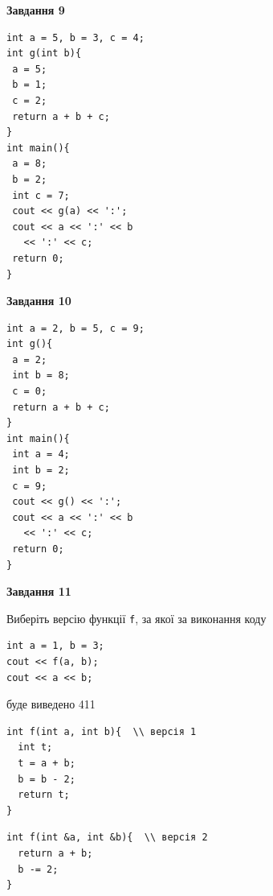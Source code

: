 \documentclass[12pt, ukrainian]{article}
\def\code#1{\Verb!#1!}
\begin{document}
{\begin {large}
\begin{minipage}[t]{11.0cm}
\end{minipage}


\begin{minipage}[t]{7.0cm}

\begin{center}
\textbf{Завдання 9}
\end{center}
\vspace{-8mm}

\begin{verbatim}
int a = 5, b = 3, c = 4;
int g(int b){
 a = 5;
 b = 1;
 c = 2;
 return a + b + c;
}
int main(){
 a = 8;
 b = 2;
 int c = 7;
 cout << g(a) << ':';
 cout << a << ':' << b 
   << ':' << c;
 return 0;
}
\end{verbatim}



\begin{center}
\textbf{Завдання 10}
\end{center}
\vspace{-8mm}

\begin{verbatim}
int a = 2, b = 5, c = 9;
int g(){
 a = 2;
 int b = 8;
 c = 0;
 return a + b + c;
}
int main(){
 int a = 4;
 int b = 2;
 c = 9;
 cout << g() << ':';
 cout << a << ':' << b 
   << ':' << c;
 return 0;
}
\end{verbatim}

\end{minipage}
\vline \hspace{1mm}
\begin{minipage}[t]{11.0cm}

\begin{center}
\textbf{Завдання 11}
\end{center}
Виберіть версію функції \code{f}, за якої за виконання коду
\begin{verbatim}
int a = 1, b = 3;
cout << f(a, b);
cout << a << b;
\end{verbatim}

буде виведено 411

\begin{verbatim}
int f(int a, int b){  \\ версія 1
  int t;
  t = a + b;
  b = b - 2;
  return t;
}
\end{verbatim}

\vspace{-8mm}\begin{verbatim}
int f(int &a, int &b){  \\ версія 2
  return a + b;
  b -= 2;
}
\end{verbatim}


\end{minipage}
\end{large}}
\end{document}
